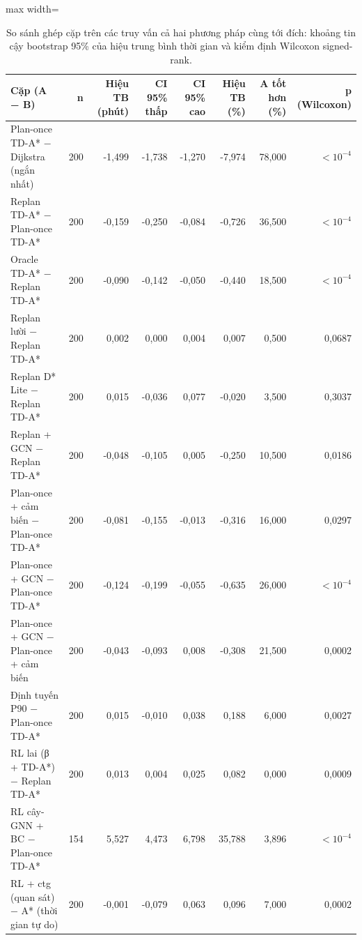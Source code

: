 \begin{table}[!htbp]
\centering
\small
\caption{So sánh ghép cặp trên các truy vấn cả hai phương pháp cùng tới đích: khoảng tin cậy bootstrap 95\% của hiệu trung bình thời gian và kiểm định Wilcoxon signed-rank.}
\label{tab:tab_stat_tests}
\begin{adjustbox}{max width=\linewidth}
\begin{tabular}{lrrrrrrr}
\toprule
Cặp (A − B) & n & Hiệu TB (phút) & CI 95\% thấp & CI 95\% cao & Hiệu TB (\%) & A tốt hơn (\%) & p (Wilcoxon) \\
\midrule
Plan-once TD-A* − Dijkstra (ngắn nhất) & 200 & -1{,}499 & -1{,}738 & -1{,}270 & -7{,}974 & 78{,}000 & $<10^{-4}$ \\
Replan TD-A* − Plan-once TD-A* & 200 & -0{,}159 & -0{,}250 & -0{,}084 & -0{,}726 & 36{,}500 & $<10^{-4}$ \\
Oracle TD-A* − Replan TD-A* & 200 & -0{,}090 & -0{,}142 & -0{,}050 & -0{,}440 & 18{,}500 & $<10^{-4}$ \\
Replan lười − Replan TD-A* & 200 & 0{,}002 & 0{,}000 & 0{,}004 & 0{,}007 & 0{,}500 & 0{,}0687 \\
Replan D* Lite − Replan TD-A* & 200 & 0{,}015 & -0{,}036 & 0{,}077 & -0{,}020 & 3{,}500 & 0{,}3037 \\
Replan + GCN − Replan TD-A* & 200 & -0{,}048 & -0{,}105 & 0{,}005 & -0{,}250 & 10{,}500 & 0{,}0186 \\
Plan-once + cảm biến − Plan-once TD-A* & 200 & -0{,}081 & -0{,}155 & -0{,}013 & -0{,}316 & 16{,}000 & 0{,}0297 \\
Plan-once + GCN − Plan-once TD-A* & 200 & -0{,}124 & -0{,}199 & -0{,}055 & -0{,}635 & 26{,}000 & $<10^{-4}$ \\
Plan-once + GCN − Plan-once + cảm biến & 200 & -0{,}043 & -0{,}093 & 0{,}008 & -0{,}308 & 21{,}500 & 0{,}0002 \\
Định tuyến P90 − Plan-once TD-A* & 200 & 0{,}015 & -0{,}010 & 0{,}038 & 0{,}188 & 6{,}000 & 0{,}0027 \\
RL lai (β + TD-A*) − Replan TD-A* & 200 & 0{,}013 & 0{,}004 & 0{,}025 & 0{,}082 & 0{,}000 & 0{,}0009 \\
RL cây-GNN + BC − Plan-once TD-A* & 154 & 5{,}527 & 4{,}473 & 6{,}798 & 35{,}788 & 3{,}896 & $<10^{-4}$ \\
RL + ctg (quan sát) − A* (thời gian tự do) & 200 & -0{,}001 & -0{,}079 & 0{,}063 & 0{,}096 & 7{,}000 & 0{,}0002 \\
\bottomrule
\end{tabular}
\end{adjustbox}
\end{table}
